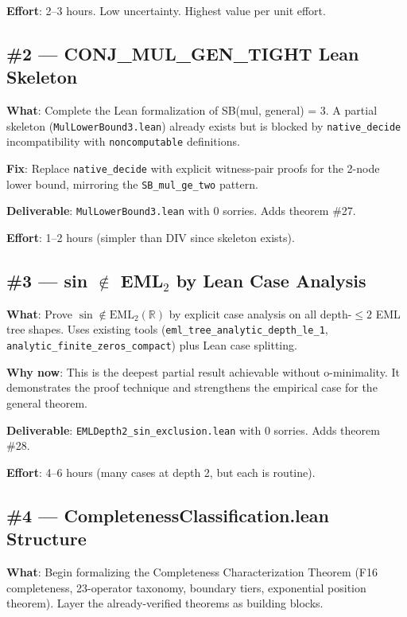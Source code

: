 \documentclass[12pt]{article}
\theoremstyle{definition}
\begin{document}
\textbf{Effort}: 2--3 hours. Low uncertainty. Highest value per unit effort.

\subsection{\textcolor{high}{\#2 — CONJ\_MUL\_GEN\_TIGHT Lean Skeleton}}

\textbf{What}: Complete the Lean formalization of SB(mul, general) = 3.
A partial skeleton (\texttt{MulLowerBound3.lean}) already exists but is blocked
by \texttt{native\_decide} incompatibility with \texttt{noncomputable} definitions.

\textbf{Fix}: Replace \texttt{native\_decide} with explicit witness-pair proofs for the
2-node lower bound, mirroring the \texttt{SB\_mul\_ge\_two} pattern.

\textbf{Deliverable}: \texttt{MulLowerBound3.lean} with 0 sorries. Adds theorem \#27.

\textbf{Effort}: 1--2 hours (simpler than DIV since skeleton exists).

\subsection{\textcolor{med}{\#3 — sin $\notin$ EML$_2$ by Lean Case Analysis}}

\textbf{What}: Prove $\sin \notin \mathrm{EML}_2(\mathbb{R})$ by explicit case analysis
on all depth-$\leq 2$ EML tree shapes. Uses existing tools
(\texttt{eml\_tree\_analytic\_depth\_le\_1}, \texttt{analytic\_finite\_zeros\_compact})
plus Lean case splitting.

\textbf{Why now}: This is the deepest partial result achievable without o-minimality.
It demonstrates the proof technique and strengthens the empirical case for the general theorem.

\textbf{Deliverable}: \texttt{EMLDepth2\_sin\_exclusion.lean} with 0 sorries. Adds theorem \#28.

\textbf{Effort}: 4--6 hours (many cases at depth 2, but each is routine).

\subsection{\textcolor{med}{\#4 — CompletenessClassification.lean Structure}}

\textbf{What}: Begin formalizing the Completeness Characterization Theorem
(F16 completeness, 23-operator taxonomy, boundary tiers, exponential position theorem).
Layer the already-verified theorems as building blocks.
\end{document}
